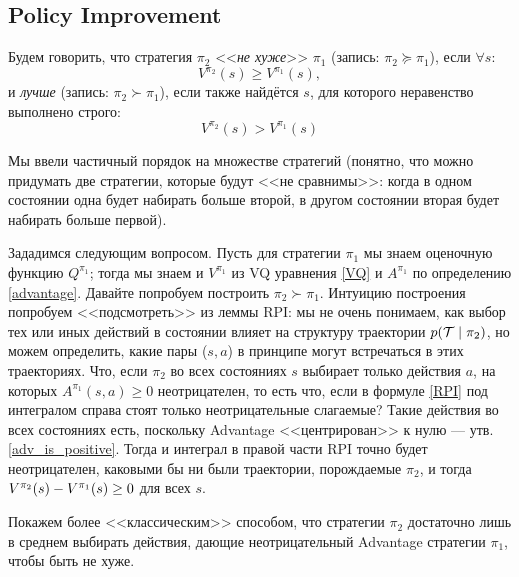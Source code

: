 \subsection{Policy Improvement}

\begin{definition}
Будем говорить, что стратегия $\pi_2$ <<\emph{не хуже}>> $\pi_1$ (запись: $\pi_2 \succeq \pi_1$), если $\forall s \colon$
$$V^{\pi_2}(s) \ge V^{\pi_1}(s),$$
и \emph{лучше} (запись: $\pi_2 \succ \pi_1$), если также найдётся $s$, для которого неравенство выполнено строго:
$$V^{\pi_2}(s) > V^{\pi_1}(s)$$
\end{definition}

Мы ввели частичный порядок на множестве стратегий (понятно, что можно придумать две стратегии, которые будут <<не сравнимы>>: когда в одном состоянии одна будет набирать больше второй, в другом состоянии вторая будет набирать больше первой).

Зададимся следующим вопросом. Пусть для стратегии $\pi_1$ мы знаем оценочную функцию $Q^{\pi_1}$; тогда мы знаем и $V^{\pi_1}$ из VQ уравнения \eqref{VQ} и $A^{\pi_1}$ по определению \eqref{advantage}. Давайте попробуем построить $\pi_2 \succ \pi_1$. Интуицию построения попробуем <<подсмотреть>> из леммы RPI: мы не очень понимаем, как выбор тех или иных действий в состоянии влияет на структуру траектории $p(\mathcal{T} \mid \pi_2)$, но можем определить, какие пары ($s, a$) в принципе могут встречаться в этих траекториях. Что, если $\pi_2$ во всех состояниях $s$ выбирает только действия $a$, на которых $A^{\pi_1}(s, a) \ge 0$ неотрицателен, то есть что, если в формуле \eqref{RPI} под интегралом справа стоят только неотрицательные слагаемые? Такие действия во всех состояниях есть, поскольку Advantage <<центрирован>> к нулю --- утв. \ref{adv_is_positive}. Тогда и интеграл в правой части RPI точно будет неотрицателен, каковыми бы ни были траектории, порождаемые $\pi_2$, и тогда $V^{\pi_2}(s) \HM- V^{\pi_1}(s) \HM\ge 0$ для всех $s$.

Покажем более <<классическим>> способом, что стратегии $\pi_2$ достаточно лишь в среднем выбирать действия, дающие неотрицательный Advantage стратегии $\pi_1$, чтобы быть не хуже.

